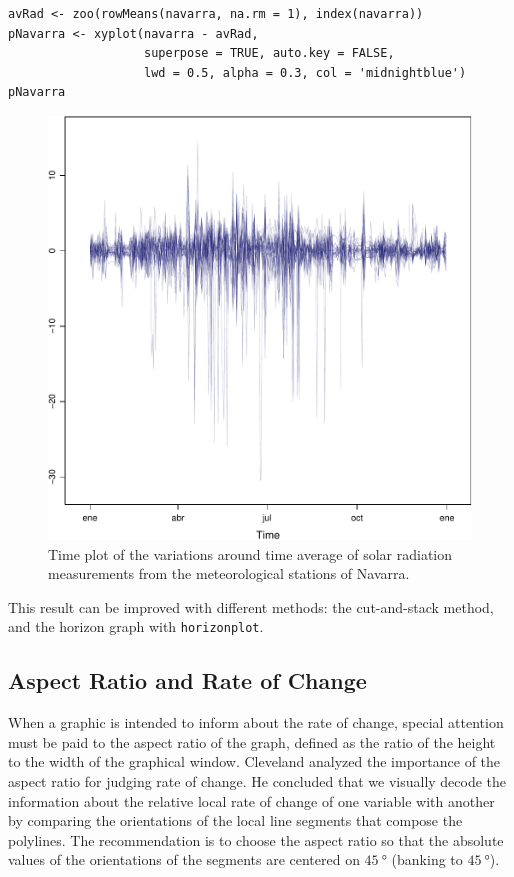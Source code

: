 \documentclass[smallroyalvopaper]{memoir}
\begin{document}

\lstset{language=r,label= ,caption= ,captionpos=b,numbers=none}
\begin{lstlisting}
avRad <- zoo(rowMeans(navarra, na.rm = 1), index(navarra))
pNavarra <- xyplot(navarra - avRad,
                   superpose = TRUE, auto.key = FALSE,
                   lwd = 0.5, alpha = 0.3, col = 'midnightblue') 
pNavarra
\end{lstlisting}

\begin{figure}[htbp]
\centering
\includegraphics[width=.9\linewidth]{figs/navarra.pdf}
\caption{Time plot of the variations around time average of solar radiation measurements from the meteorological stations of Navarra. \label{fig:navarraNaive}}
\end{figure}

This result can be improved with different methods: the cut-and-stack
method, and the horizon graph with \texttt{horizonplot}.

\subsection{Aspect Ratio and Rate of Change}
\label{sec:org398c316}
When a graphic is intended to inform about the rate of change,
special attention must be paid to the aspect ratio of the graph,
defined as the ratio of the height to the width of the graphical
window. Cleveland analyzed the importance of the aspect ratio for
judging rate of change. He concluded that we visually decode the
information about the relative local rate of change of one
variable with another by comparing the orientations of the local
line segments that compose the polylines. The recommendation is to
choose the aspect ratio so that the absolute values of the
orientations of the segments are centered on \(\SI{45}{\degree}\) (banking
to \(\SI{45}{\degree}\)). 
\end{document}
